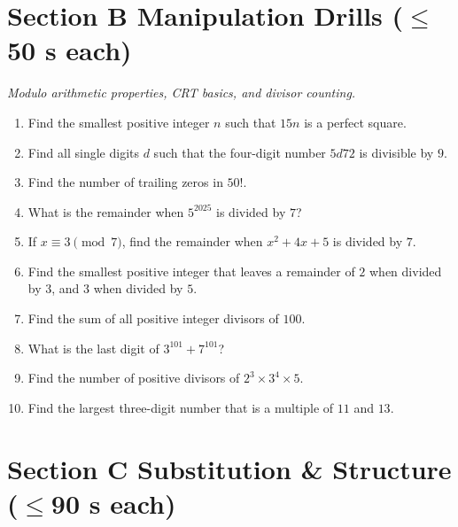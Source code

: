 \documentclass[11pt,a4paper]{article}
\begin{document}
\section*{Section B \quad Manipulation Drills \hfill{\normalfont\small($\leq$50 s each)}}

\noindent\textit{Modulo arithmetic properties, CRT basics, and divisor counting.}

\begin{enumerate}

\item Find the smallest positive integer $n$ such that $15n$ is a perfect square.

\item Find all single digits $d$ such that the four-digit number $5d72$ is divisible by $9$.

\item Find the number of trailing zeros in $50!$.

\item What is the remainder when $5^{2025}$ is divided by $7$?

\item If $x \equiv 3 \pmod 7$, find the remainder when $x^2 + 4x + 5$ is divided by $7$.

\item Find the smallest positive integer that leaves a remainder of $2$ when divided by $3$, and $3$ when divided by $5$.

\item Find the sum of all positive integer divisors of $100$.

\item What is the last digit of $3^{101} + 7^{101}$?

\item Find the number of positive divisors of $2^3 \times 3^4 \times 5$.

\item Find the largest three-digit number that is a multiple of $11$ and $13$.

\end{enumerate}

\section*{Section C \quad Substitution \& Structure \hfill{\normalfont\small($\leq$90 s each)}}
\end{document}
